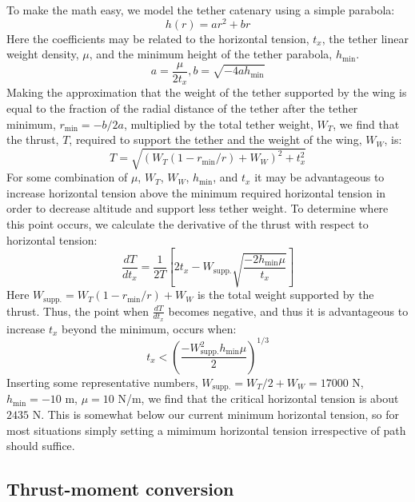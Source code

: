 \documentclass[11pt]{amsart}
\begin{document}
To make the math easy, we model the tether catenary using a simple
parabola:
\begin{equation}
h(r) = a r^2 + b r
\end{equation}
Here the coefficients may be related to the horizontal tension, $t_x$,
the tether linear weight density, $\mu$, and the minimum height of the
tether parabola, $h_{\mathrm{min}}$.
\begin{equation}
a = \frac{\mu}{2 t_x}, b = \sqrt{-4 a h_{\mathrm{min}}}
\end{equation}
Making the approximation that the weight of the tether supported by
the wing is equal to the fraction of the radial distance of the tether
after the tether minimum, $r_{\mathrm{min}} = -b / 2a$, multiplied by the total
tether weight, $W_T$, we find that the thrust, $T$, required to
support the tether and the weight of the wing, $W_W$, is:
\begin{equation}
T = \sqrt{(W_T (1 - r_{\mathrm{min}} / r) + W_W)^2 + t_x^2}
\end{equation}
For some combination of $\mu$, $W_T$, $W_W$, $h_{\mathrm{min}}$, and
$t_x$ it may be advantageous to increase horizontal tension above the
minimum required horizontal tension in order to decrease altitude and
support less tether weight.  To determine where this point occurs, we
calculate the derivative of the thrust with respect to horizontal
tension:
\begin{equation}
\frac{dT}{dt_x} = \frac{1}{2 T}
\left[2 t_x - W_{\mathrm{supp.}} \sqrt{\frac{-2 h_{\mathrm{min}} \mu}{t_x}} \right] 
\end{equation}
Here $W_{\mathrm{supp.}} = W_T (1 - r_{\mathrm{min}} / r) + W_W$ is
the total weight supported by the thrust.  Thus, the point when
$\frac{dT}{dt_x}$ becomes negative, and thus it is advantageous to
increase $t_x$ beyond the minimum, occurs when:
\begin{equation}
t_x < \left( \frac{-W_{\mathrm{supp.}}^2 h_{\mathrm{min}} \mu}{2} \right)^{1/3}
\end{equation}
Inserting some representative numbers, $W_{\mathrm{supp.}} = W_T/2 +
W_W = 17000$ N, $h_{\mathrm{min}} = -10$ m, $\mu = 10$ N/m, we find
that the critical horizontal tension is about $2435$ N.  This is
somewhat below our current minimum horizontal tension, so for most
situations simply setting a mimimum horizontal tension irrespective of
path should suffice.



\subsection{Thrust-moment conversion}
\end{document}
